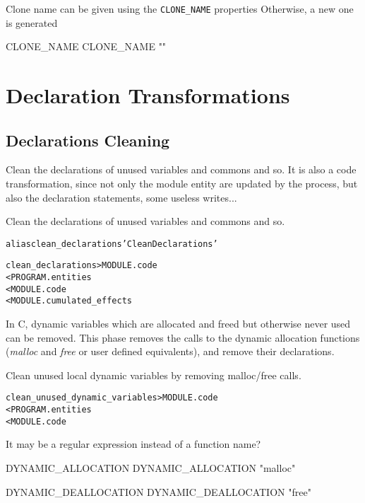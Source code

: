 \documentclass[a4paper]{report}
\newenvironment{PipsMake}{\begin{alltt}}{\end{alltt}}
\newenvironment{PipsPass}[1]{\label{pass:#1}}{}
\begin{document}
Clone name can be given using the \lstinline|CLONE_NAME| properties
Otherwise, a new one is generated
\begin{PipsProp}{CLONE_NAME}
CLONE_NAME ""
\end{PipsProp}



\section{Declaration Transformations}

\subsection{Declarations Cleaning}

Clean the declarations of unused variables and commons and so.
It is also a code transformation, since not only the module entity are
updated by the process, but also the declaration statements, some useless writes...

\begin{PipsPass}{clean_declarations}
Clean the declarations of unused variables and commons and so.
\end{PipsPass}

\begin{PipsMake}
alias clean_declarations 'Clean Declarations'

clean_declarations      > MODULE.code
        < PROGRAM.entities
        < MODULE.code
		< MODULE.cumulated_effects
\end{PipsMake}

In C, dynamic variables which are allocated and freed but otherwise
never used can be removed. This phase removes the calls to the
dynamic allocation functions (\emph{malloc} and \emph{free} or
user defined equivalents), and remove their declarations.

\begin{PipsPass}{clean_dynamic_variables}
Clean unused local dynamic variables by removing malloc/free calls.
\end{PipsPass}
\begin{PipsMake}
clean_unused_dynamic_variables > MODULE.code
	< PROGRAM.entities
	< MODULE.code
\end{PipsMake}

It may be a regular expression instead of a function name?
\begin{PipsProp}{DYNAMIC_ALLOCATION}
DYNAMIC_ALLOCATION "malloc"
\end{PipsProp}
\begin{PipsProp}{DYNAMIC_DEALLOCATION}
DYNAMIC_DEALLOCATION "free"
\end{PipsProp}
\end{document}
